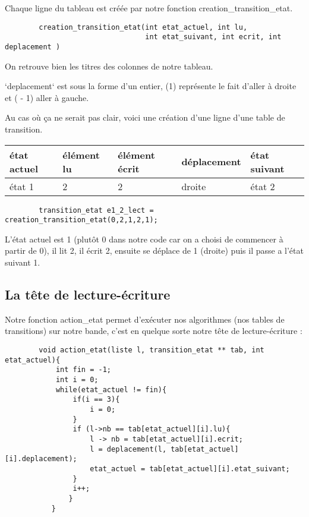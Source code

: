 \documentclass[a4paper,10pt, parskip=true]{scrartcl}
\begin{document}
        
        Chaque ligne du tableau est créée par notre fonction creation\_transition\_etat. 
        
        \begin{verbatim}
        creation_transition_etat(int etat_actuel, int lu, 
                                 int etat_suivant, int ecrit, int deplacement )
        \end{verbatim}
        
        On retrouve bien les titres des colonnes de notre tableau.
        
        `deplacement` est sous la forme d'un entier, (1) représente le fait d'aller à droite et ( - 1) aller à gauche.
        
        Au cas où ça ne serait pas clair, voici une création d'une ligne d'une table de transition.
        
        
        \begin{tabular}{|l|l|l|l|l|}
          \hline
          état actuel & élément lu & élément  écrit & déplacement & état suivant\\
          \hline
          état 1 & 2 & 2 & droite & état 2  \\
          \hline
        \end{tabular}
        
        \begin{verbatim}
        transition_etat e1_2_lect = creation_transition_etat(0,2,1,2,1);
        \end{verbatim}
        
        L’état actuel est 1 (plutôt 0 dans notre code car on a choisi de commencer à partir de 0), il lit 2, il écrit 2, ensuite se déplace de 1 (droite) puis il passe a l’état suivant 1. 
        

    \subsection{La tête de lecture-écriture}
        Notre fonction action\_etat permet d'exécuter nos algorithmes (nos tables de transitions) sur notre bande, c'est en quelque sorte notre tête de lecture-écriture : 
        
        \begin{verbatim}
        void action_etat(liste l, transition_etat ** tab, int etat_actuel){
            int fin = -1;
            int i = 0;
            while(etat_actuel != fin){
                if(i == 3){
                    i = 0;
                }
                if (l->nb == tab[etat_actuel][i].lu){
                    l -> nb = tab[etat_actuel][i].ecrit;
                    l = deplacement(l, tab[etat_actuel][i].deplacement);             
                    etat_actuel = tab[etat_actuel][i].etat_suivant;
                }
                i++;
               }
           }
        \end{verbatim}
        
\end{document}
